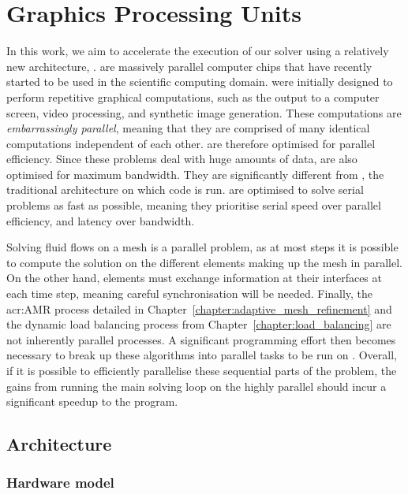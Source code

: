 \chapter{Graphics Processing Units}\label{chapter:graphics_processing_units}

In this work, we aim to accelerate the execution of our solver using a relatively new architecture,
.  are massively parallel computer chips that have recently
started to be used in the scientific computing domain.  were initially designed
to perform repetitive graphical computations, such as the output to a computer screen, video
processing, and synthetic image generation. These computations are \textit{embarrassingly parallel},
meaning that they are comprised of many identical computations independent of each other.
 are therefore optimised for parallel efficiency. Since these problems deal with
huge amounts of data,  are also optimised for maximum bandwidth. They are
significantly different from \textit{}, the traditional architecture on which
code is run.  are optimised to solve serial problems as fast as possible,
meaning they prioritise serial speed over parallel efficiency, and latency over bandwidth. 

Solving fluid flows on a mesh is a parallel problem, as at most steps it is possible to compute the
solution on the different elements making up the mesh in parallel. On the other hand, elements must
exchange information at their interfaces at each time step, meaning careful synchronisation will be
needed. Finally, the \acrlong{acr:AMR} process detailed in
Chapter~\ref{chapter:adaptive_mesh_refinement} and the dynamic load balancing process from
Chapter~\ref{chapter:load_balancing} are not inherently parallel processes. A significant
programming effort then becomes necessary to break up these algorithms into parallel tasks to be run
on . Overall, if it is possible to efficiently parallelise these sequential
parts of the problem, the gains from running the main solving loop on the highly parallel
 should incur a significant speedup to the program.

\section{Architecture}\label{section:graphics_processing_units:architecture}

\subsection{Hardware model}\label{subsection:graphics_processing_units:architecture:hardware_model}

